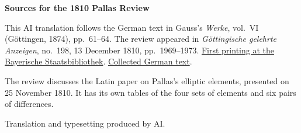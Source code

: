 \clearpage\thispagestyle{empty}
\begin{center}\textbf{Sources for the 1810 Pallas Review}\end{center}
\noindent This AI translation follows the German text in Gauss’s \textit{Werke}, vol.~VI (Göttingen, 1874), pp.~61--64. The review appeared in \textit{Göttingische gelehrte Anzeigen}, no.~198, 13 December 1810, pp.~1969--1973. \href{https://www.digitale-sammlungen.de/de/view/bsb10538678?page=939}{First printing at the Bayerische Staatsbibliothek}. \href{https://gdz.sub.uni-goettingen.de/id/PPN236007467}{Collected German text}.
\par\smallskip\noindent The review discusses the Latin paper on Pallas’s elliptic elements, presented on 25 November 1810. It has its own tables of the four sets of elements and six pairs of differences.
\par\smallskip\noindent Translation and typesetting produced by AI.
\clearpage
